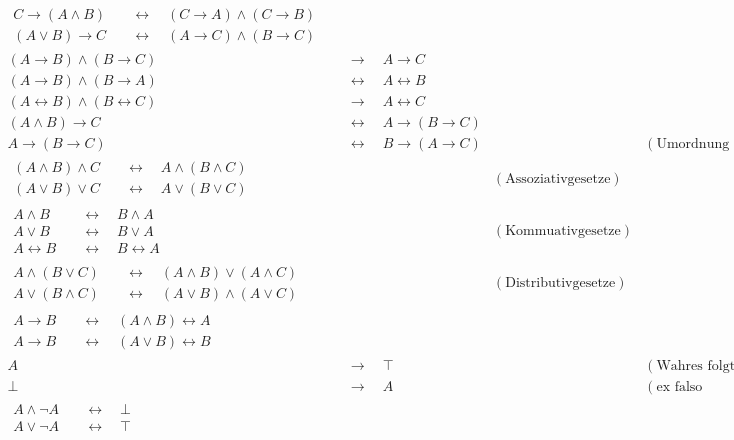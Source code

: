 \begin{align*}
    \begin{split}
        C\to (A\land B) & \quad\leftrightarrow\quad (C\to A) \land (C\to B) \\
        (A\lor B) \to C & \quad\leftrightarrow\quad (A\to C) \land (B\to C)
    \end{split} \\[1em]
    (A \to B) \land (B \to C) & \quad \to\quad A \to C \\ 
    (A \to B) \land (B \to A) & \quad\leftrightarrow\quad A \leftrightarrow B \\
    (A\leftrightarrow B)\land (B\leftrightarrow C) & \quad \to\quad A\leftrightarrow C \\[1em]
    (A \land B) \to C & \quad\leftrightarrow\quad A \to (B \to C) \\
    A \to (B \to C) & \quad\leftrightarrow\quad  B \to (A \to C) && ( \text{Umordnung der Prämissen}) \\[1em]
    \begin{split}
        (A \land B) \land C & \quad\leftrightarrow\quad A \land (B \land C) \\
        (A \lor B) \lor C & \quad\leftrightarrow\quad  A \lor (B \lor C)
    \end{split} && (\text{Assoziativgesetze}) \\[1em]
    \begin{split}
        A \land B & \quad\leftrightarrow\quad  B \land A \\
        A \lor B & \quad\leftrightarrow\quad  B \lor A \\
        A\leftrightarrow B &\quad\leftrightarrow\quad  B \leftrightarrow A
    \end{split} && ( \text{Kommuativgesetze}) \\[1em]
    \begin{split} A \land (B \lor C) & \quad\leftrightarrow\quad  (A \land B) \lor (A \land C) \\
        A \lor (B \land C) & \quad\leftrightarrow\quad  (A \lor B) \land (A \lor C)
    \end{split} && ( \text{Distributivgesetze}) \\[1em]
    \begin{split}
        A \to B & \quad\leftrightarrow\quad (A \land B) \leftrightarrow A \\
        A \to B & \quad\leftrightarrow\quad (A \lor B) \leftrightarrow B
    \end{split} \\[1em]
    A & \quad\to\quad \top && (\text{Wahres folgt aus Beliebigem}) \\
    \bot & \quad\to\quad A && (\text{ex falso quodlibet}) \\[1em]
    \begin{split}
        A \land \neg A & \quad\leftrightarrow\quad \bot \\
        A \lor \neg A & \quad\leftrightarrow\quad \top
    \end{split}
\end{align*}
